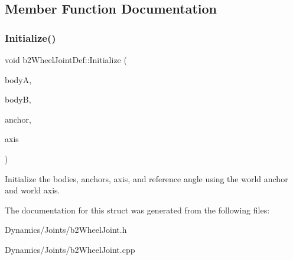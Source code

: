 \subsection{Member Function Documentation}
\mbox{\label{structb2WheelJointDef_af26887092d36c3cd03898401a38783e2}} 
\subsubsection{\texorpdfstring{Initialize()}{Initialize()}}
{\footnotesize\ttfamily void b2\+Wheel\+Joint\+Def\+::\+Initialize (\begin{DoxyParamCaption}\item[{\mbox{\hyperlink{classb2Body}{b2\+Body}} $\ast$}]{bodyA,  }\item[{\mbox{\hyperlink{classb2Body}{b2\+Body}} $\ast$}]{bodyB,  }\item[{const \mbox{\hyperlink{structb2Vec2}{b2\+Vec2}} \&}]{anchor,  }\item[{const \mbox{\hyperlink{structb2Vec2}{b2\+Vec2}} \&}]{axis }\end{DoxyParamCaption})}

Initialize the bodies, anchors, axis, and reference angle using the world anchor and world axis. 

The documentation for this struct was generated from the following files\+:\begin{DoxyCompactItemize}
\item 
Dynamics/\+Joints/b2\+Wheel\+Joint.\+h\item 
Dynamics/\+Joints/b2\+Wheel\+Joint.\+cpp\end{DoxyCompactItemize}
